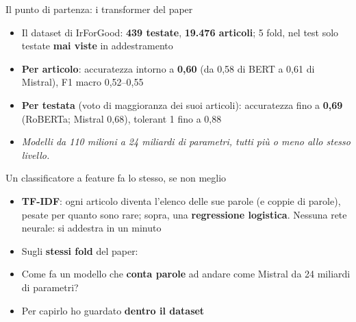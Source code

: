 \documentclass[aspectratio=169]{beamer}
\newcommand{\hl}[1]{\textbf{#1}}
\begin{document}
\begin{frame}{Il punto di partenza: i transformer del paper}
  \vfill
  \begin{itemize}[<+->]
    \setlength\itemsep{0.8em}
    \item Il dataset di IrForGood: \hl{439 testate}, \hl{19.476 articoli}; 5 fold, nel test solo testate \hl{mai viste} in addestramento
    \item \hl{Per articolo}: accuratezza intorno a \hl{0,60} (da 0,58 di BERT a 0,61 di Mistral), F1 macro 0,52--0,55
    \item \hl{Per testata} (voto di maggioranza dei suoi articoli): accuratezza fino a \hl{0,69} (RoBERTa; Mistral 0,68), tolerant 1 fino a 0,88
    \item[] {\small\itshape Modelli da 110 milioni a 24 miliardi di parametri, tutti pi\`u o meno allo stesso livello.}
  \end{itemize}
  \vfill
\end{frame}

\begin{frame}{Un classificatore a feature fa lo stesso, se non meglio}
  \begin{itemize}[<+->]
    \setlength\itemsep{0.5em}
    \item \hl{TF-IDF}: ogni articolo diventa l'elenco delle sue parole (e coppie di parole), pesate per quanto sono rare; sopra, una \hl{regressione logistica}. Nessuna rete neurale: si addestra in un minuto
    \item Sugli \hl{stessi fold} del paper:
  \end{itemize}
  \vspace{0.3em}
  \vspace{0.6em}
  \begin{itemize}[<+->]
    \setcounter{beamerpauses}{4}
    \item Come fa un modello che \hl{conta parole} ad andare come Mistral da 24 miliardi di parametri?
    \item Per capirlo ho guardato \hl{dentro il dataset}
  \end{itemize}
\end{frame}
\end{document}
